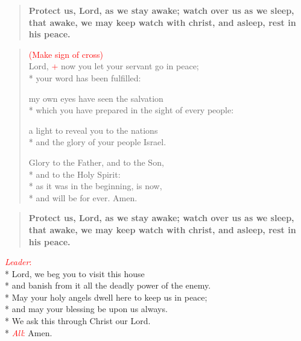 \documentclass[letterpaper,12pt]{extarticle}
\newcommand{\side}[1]{\flagverse{\textcolor{red}{\textit{#1}}:}}
\newcommand{\sidestar}[1]{\textcolor{red}{\textit{#1}:}}
\newcommand{\rednote}[1]{\textcolor{red}{#1}}
\newlength{\oldindent}
\newcommand{\antiphon}[2]{
	\setlength{\oldindent}{\vindent}
	\setlength{\vindent}{0em}
	\begin{verse}
	\side{#1} \textbf{#2}
	\end{verse}
	\setlength{\vindent}{\oldindent}
}
\begin{document}
\vspace{-1.5\baselineskip}
\antiphon{Leader}{Protect us, Lord, as we stay awake; watch over us as we sleep,
that awake, we may keep watch with christ, and asleep, rest in his peace.}
\setlength{\stanzaskip}{0.25\baselineskip}
\begin{verse}
\rednote{(Make sign of cross)}\\
	\side{All} Lord, \rednote{+} now you let your servant go in peace; \\*
your word has been fulfilled:

my own eyes have seen the salvation \\*
which you have prepared in the sight of every people:

a light to reveal you to the nations \\*
and the glory of your people Israel.

Glory to the Father, and to the Son, \\*
and to the Holy Spirit: \\*
as it was in the beginning, is now, \\*
and will be for ever. Amen.
\end{verse}
\setlength{\stanzaskip}{0.75\baselineskip}
\antiphon{All}{Protect us, Lord, as we stay awake; watch over us as we sleep,
that awake, we may keep watch with christ, and asleep, rest in his peace.}

\vspace{-1.5\baselineskip}
\sidestar{Leader}\\*
Lord, we beg you to visit this house \\*
and banish from it all the deadly power of the enemy. \\*
May your holy angels dwell here to keep us in peace; \\*
and may your blessing be upon us always. \\*
We ask this through Christ our Lord. \\*
\sidestar{All} Amen.

%
\end{document}
